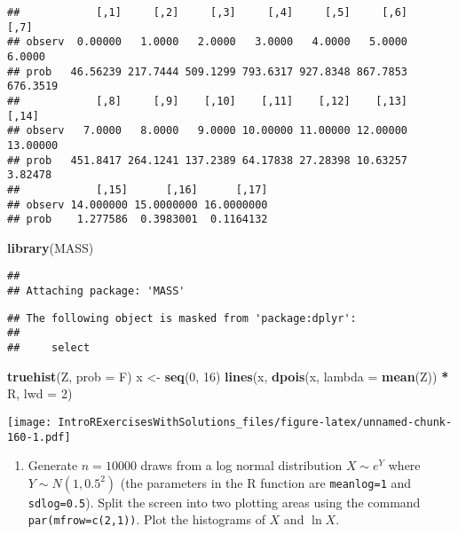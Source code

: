 \documentclass[]{article}
\newenvironment{Shaded}{\begin{snugshade}}{\end{snugshade}}
\newcommand{\KeywordTok}[1]{\textcolor[rgb]{0.13,0.29,0.53}{\textbf{#1}}}
\newcommand{\DataTypeTok}[1]{\textcolor[rgb]{0.13,0.29,0.53}{#1}}
\newcommand{\DecValTok}[1]{\textcolor[rgb]{0.00,0.00,0.81}{#1}}
\newcommand{\StringTok}[1]{\textcolor[rgb]{0.31,0.60,0.02}{#1}}
\newcommand{\OperatorTok}[1]{\textcolor[rgb]{0.81,0.36,0.00}{\textbf{#1}}}
\newcommand{\NormalTok}[1]{#1}
\providecommand{\tightlist}{%
  \setlength{\itemsep}{0pt}\setlength{\parskip}{0pt}}
\begin{document}
\begin{verbatim}
##            [,1]     [,2]     [,3]     [,4]     [,5]     [,6]     [,7]
## observ  0.00000   1.0000   2.0000   3.0000   4.0000   5.0000   6.0000
## prob   46.56239 217.7444 509.1299 793.6317 927.8348 867.7853 676.3519
##            [,8]     [,9]    [,10]    [,11]    [,12]    [,13]    [,14]
## observ   7.0000   8.0000   9.0000 10.00000 11.00000 12.00000 13.00000
## prob   451.8417 264.1241 137.2389 64.17838 27.28398 10.63257  3.82478
##            [,15]      [,16]      [,17]
## observ 14.000000 15.0000000 16.0000000
## prob    1.277586  0.3983001  0.1164132
\end{verbatim}

\begin{Shaded}
\begin{Highlighting}[]
\KeywordTok{library}\NormalTok{(MASS)}
\end{Highlighting}
\end{Shaded}

\begin{verbatim}
## 
## Attaching package: 'MASS'
\end{verbatim}

\begin{verbatim}
## The following object is masked from 'package:dplyr':
## 
##     select
\end{verbatim}

\begin{Shaded}
\begin{Highlighting}[]
\KeywordTok{truehist}\NormalTok{(Z, }\DataTypeTok{prob =}\NormalTok{ F)  }
\NormalTok{x <-}\StringTok{ }\KeywordTok{seq}\NormalTok{(}\DecValTok{0}\NormalTok{, }\DecValTok{16}\NormalTok{)}
\KeywordTok{lines}\NormalTok{(x, }\KeywordTok{dpois}\NormalTok{(x, }\DataTypeTok{lambda =} \KeywordTok{mean}\NormalTok{(Z)) }\OperatorTok{*}\StringTok{ }\NormalTok{R, }\DataTypeTok{lwd =} \DecValTok{2}\NormalTok{)  }
\end{Highlighting}
\end{Shaded}

\texttt{[image: IntroRExercisesWithSolutions\_files/figure-latex/unnamed-chunk-160-1.pdf]}

\begin{enumerate}
\def\labelenumi{\arabic{enumi}.}
\setcounter{enumi}{1}
\tightlist
\item
  Generate \(n=10000\) draws from a log normal distribution
  \(X\sim e^{Y}\) where \(Y\sim N(1,0.5^{2})\) (the parameters in the R
  function are \texttt{meanlog=1} and \texttt{sdlog=0.5}). Split the
  screen into two plotting areas using the command
  \texttt{par(mfrow=c(2,1))}. Plot the histograms of \(X\) and
  \(\ln X\).
\end{enumerate}
\end{document}
